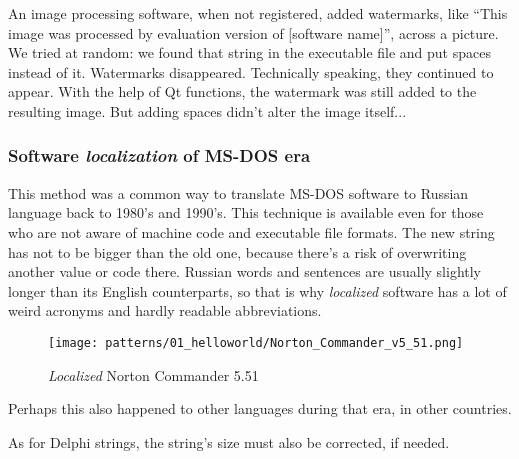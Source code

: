 An image processing software, when not registered, added watermarks,
like ``This image was processed by evaluation version of [software name]'', across a picture.
We tried at random: we found that string in the executable file and put spaces instead of it.
Watermarks disappeared.
Technically speaking, they continued to appear.
With the help of Qt functions, the watermark was still added to the resulting image.
But adding spaces didn't alter the image itself...

\subsubsection{Software \emph{localization} of MS-DOS era}

This method was a common way to translate MS-DOS software to Russian language back to 1980's and 1990's.
This technique is available even for those who are not aware of machine code and executable file formats.
The new string has not to be bigger than the old one, because there's a risk of overwriting another value or code
there.
Russian words and sentences are usually slightly longer than its English counterparts, so that is why \emph{localized}
software has a lot of weird acronyms and hardly readable abbreviations.

\begin{figure}[H]
\centering
\texttt{[image: patterns/01\_helloworld/Norton\_Commander\_v5\_51.png]}
\caption{\emph{Localized} Norton Commander 5.51}
\end{figure}

Perhaps this also happened to other languages during that era, in other countries.

As for Delphi strings, the string's size must also be corrected, if needed.
